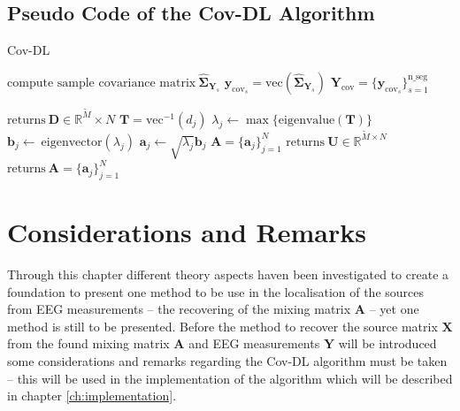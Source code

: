 \subsection{Pseudo Code of the Cov-DL Algorithm}
\begin{algorithm}[H]
\caption{Cov-DL}
\begin{algorithmic}[1]
				\State$\text{compute sample covariance matrix}\ \widehat{\boldsymbol{\Sigma}}_{\textbf{Y}_s} $
				\State$\textbf{y}_{\text{cov}_s} = \text{vec}(\widehat{\boldsymbol{\Sigma}}_{\textbf{Y}_s})$	
			\EndFor			
			\State$\textbf{Y}_{\text{cov}} = \{\textbf{y}_{\text{cov}_s}\}_{s=1}^{\text{n\_seg}}$
			
			\State$\text{returns} \ \textbf{D} \in \mathbb{R}^{\widetilde{M}}\times N$
			\EndProcedure
			\State$\textbf{T} = \text{vec}^{-1}(d_j)$            
			\State$\lambda_j\gets \max\{\text{eigenvalue}(\textbf{T})\}$
			\State$\textbf{b}_j \gets \ \text{eigenvector}(\lambda_j)$
			\State$\textbf{a}_j \gets \sqrt{\lambda_j}\textbf{b}_j$
			\EndFor
			\State$\textbf{A} = \{\textbf{a}_j\}_{j=1}^N$
			\EndIf
			\State
				\State$\text{returns} \ \textbf{U}\in \mathbb{R}^{\widetilde{M}\times N}$
				\EndProcedure
				\State$\text{returns}\ \textbf{A}= \{\textbf{a}_j\}_{j=1}^{N}$
				\EndProcedure
			\EndIf
           \EndProcedure
        \end{algorithmic} 
        \label{alg:Cov1}
\end{algorithm}

\section{Considerations and Remarks}
Through this chapter different theory aspects haven been investigated to create a foundation to present one method to be use in the localisation of the sources from EEG measurements -- the recovering of the mixing matrix $\mathbf{A}$ -- yet one method is still to be presented.
Before the method to recover the source matrix $\mathbf{X}$ from the found mixing matrix $\mathbf{A}$ and EEG measurements $\mathbf{Y}$ will be introduced some considerations and remarks regarding the Cov-DL algorithm must be taken -- this will be used in the implementation of the algorithm which will be described in chapter \ref{ch:implementation}.

